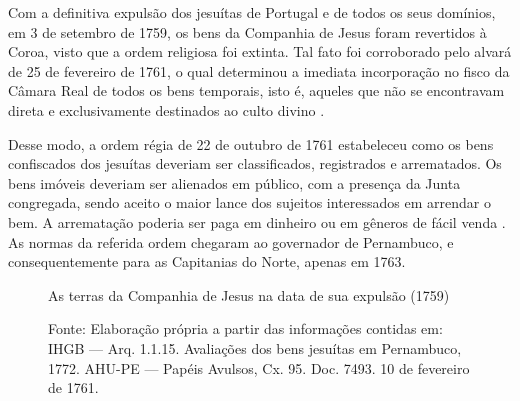 \begin{refsection}
Com a definitiva expulsão dos jesuítas de Portugal e de todos os seus domínios, em 3 de setembro de 1759, os bens da Companhia de Jesus foram revertidos à Coroa, visto que a ordem religiosa foi extinta. Tal fato foi corroborado pelo alvará de 25 de fevereiro de 1761, o qual determinou a imediata incorporação no fisco da Câmara Real de todos os bens temporais, isto é, aqueles que não se encontravam direta e exclusivamente destinados ao culto divino \cite[p.~151]{Couto1990}. 

Desse modo, a ordem régia de 22 de outubro de 1761 estabeleceu como os bens confiscados dos jesuítas deveriam ser classificados, registrados e arrematados. Os bens imóveis deveriam ser alienados em público, com a presença da Junta congregada, sendo aceito o maior lance dos sujeitos interessados em arrendar o bem. A arrematação poderia ser paga em dinheiro ou em gêneros de fácil venda \cite[p.~153]{Couto1990}. As normas da referida ordem chegaram ao governador de Pernambuco, e consequentemente para as Capitanias do Norte, apenas em 1763. 

\begin{figure}[ht]%
    \centering%
    \caption{As terras da Companhia de Jesus na data de sua expulsão (1759)}%
    \caption*{Fonte: Elaboração própria a partir das informações contidas em: IHGB --- Arq. 1.1.15. Avaliações dos bens jesuítas em Pernambuco, 1772. AHU-PE --- Papéis Avulsos, Cx. 95. Doc. 7493. 10 de fevereiro de 1761. }%
    \label{fig:fig02}%
\end{figure}%


\end{refsection}
